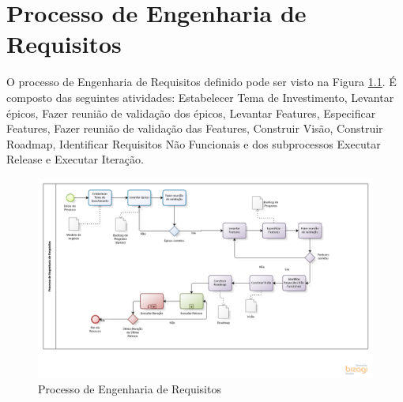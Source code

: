 \chapter[Processo de Engenharia de Requisitos]{Processo de Engenharia de Requisitos}

O processo de Engenharia de Requisitos definido pode ser visto na Figura \ref{fig:Processo}. É composto das seguintes atividades:
Estabelecer Tema de Investimento, Levantar épicos, Fazer reunião de validação dos épicos, Levantar Features, Especificar Features, 
Fazer reunião de validação das Features, Construir Visão, Construir Roadmap, Identificar Requisitos Não Funcionais e dos 
subprocessos Executar Release e Executar Iteração.

\begin{figure}[!htb]
\centering
\includegraphics[scale=0.5, angle = -90]{figuras/processo.png}
\caption{Processo de Engenharia de Requisitos}
\label{fig:Processo}
\end{figure}



